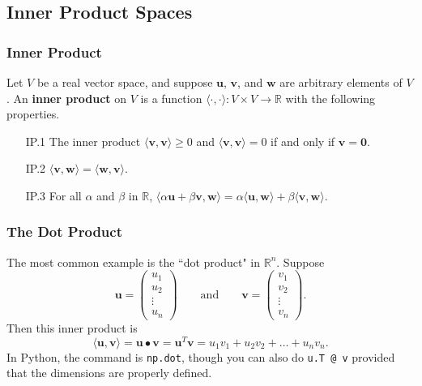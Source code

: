 \documentclass{beamer}
\begin{document}
\subsection{Inner Product Spaces}

\begin{frame}
\frametitle{Inner Product}

\begin{Definition}
Let $V$ be a real vector space, and suppose ${\boldsymbol  u}$, ${\boldsymbol  v}$, and ${\boldsymbol  w}$ are arbitrary elements of $V$. An {\bf inner product} on $V$ is a function $\langle\cdot ,\cdot\rangle:V\times V\to \mathbb{R}$ with the following properties.
\begin{enumerate}
\item[IP.1] The inner product $\langle {\boldsymbol v}, {\boldsymbol v}\rangle \geq 0$ and $\langle {\boldsymbol v}, {\boldsymbol v}\rangle = 0$ if and only if ${\boldsymbol v} = {\boldsymbol  0}$.
\item[IP.2] $\langle {\boldsymbol v}, {\boldsymbol  w}\rangle = \langle {\boldsymbol w}, {\boldsymbol  v}\rangle$.
\item[IP.3] For all $\alpha$ and $\beta$ in $\mathbb{R}$,
$\langle \alpha {\boldsymbol u} + \beta {\boldsymbol v}, {\boldsymbol w}\rangle= \alpha \langle {\boldsymbol u}, {\boldsymbol w}\rangle + \beta \langle {\boldsymbol v}, {\boldsymbol w}\rangle.$
\end{enumerate}
\end{Definition}

\end{frame}

\begin{frame}
\frametitle{The Dot Product}

The most common example is the ``dot product" in $\mathbb{R}^n$. Suppose
$$
{\boldsymbol u} = \left(\begin{array}{c} u_1\\ u_2\\ \vdots\\ u_n\end{array}\right)\qquad\text{and}\qquad {\boldsymbol v} = \left(\begin{array}{c} v_1\\ v_2\\ \vdots\\ v_n\end{array}\right).
$$
Then this inner product is
$$
\langle {\boldsymbol u}, {\boldsymbol v}\rangle = {\boldsymbol u} \bullet {\boldsymbol v} =  {\boldsymbol u}^T {\boldsymbol v} = u_1v_1 + u_2v_2 +\ldots + u_n v_n.
$$
In Python, the command is \texttt{np.dot}, though you can also do \texttt{u.T @ v} provided that the dimensions are properly defined.

\end{frame}
\end{document}
